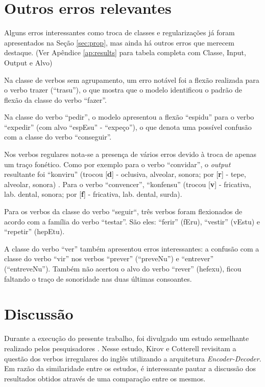 \section{Outros erros relevantes}
\label{sec:interesting}

Alguns erros interessantes como troca de classes e regularizações já foram apresentados na Seção \ref{sec:prop}, mas ainda há outros erros que merecem destaque. (Ver Apêndice \ref{ap:results} para tabela completa com Classe, Input, Output e Alvo)

Na classe de verbos sem agrupamento, um erro notável foi a flexão realizada para o verbo trazer (“trasu”), o que mostra que o modelo identificou o padrão de flexão da classe do verbo “fazer”. 

Na classe do verbo “pedir”, o modelo apresentou a flexão “espidu” para o verbo “expedir” (com alvo “espEsu” - “expeço”), o que denota uma possível confusão com a classe do verbo “conseguir”.

Nos verbos regulares nota-se a presença de vários erros devido à troca de apenas um traço fonético. Como por exemplo para o verbo “convidar”, o \textit{output} resultante foi “konviru” (trocou [\textbf{d}] - oclusiva, alveolar, sonora; por [\textbf{r}] - tepe, alveolar, sonora) . Para o verbo “convencer”, “konfensu” (trocou [\textbf{v}] - fricativa, lab. dental, sonora; por [\textbf{f}] - fricativa, lab. dental, surda).

Para os verbos da classe do verbo “seguir“, três verbos foram flexionados de acordo com a família do verbo “testar”. São eles: “ferir” (fEru), “vestir” (vEstu) e “repetir” (hepEtu).

A classe do verbo “ver” também apresentou erros interessantes: a confusão com a classe do verbo “vir” nos verbos “prever” (“preveNu”) e “entrever” (“entreveNu”). Também não acertou o alvo do verbo “rever” (hefexu), ficou faltando o traço de sonoridade nas duas últimas consoantes.

\section{Discussão}
\label{sec:discuss}

Durante a execução do presente trabalho, foi divulgado um estudo semelhante realizado pelos pesquisadores \cite{kirov:2018}. Nesse estudo, Kirov e Cotterell revisitam a questão dos verbos irregulares do inglês utilizando a arquitetura \textit{Encoder-Decoder}. Em razão da similaridade entre os estudos, é interessante pautar a discussão dos resultados obtidos através de uma comparação entre os mesmos. 

